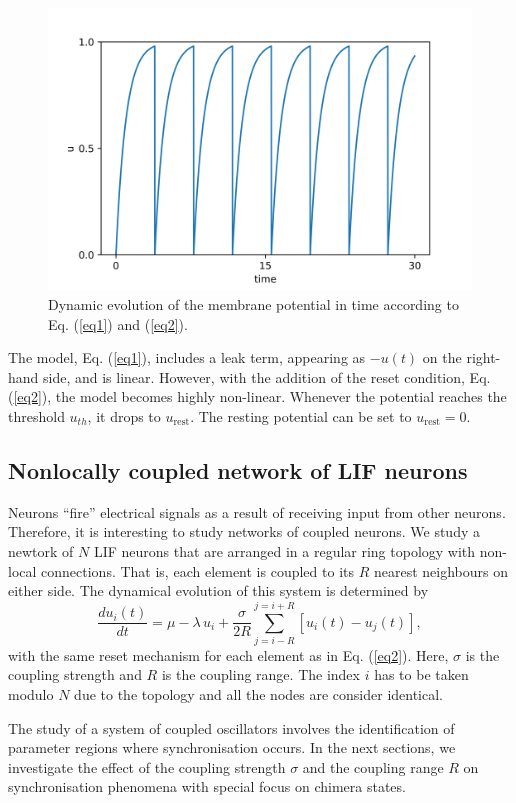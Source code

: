 \documentclass[a4paper,12pt]{article}
\begin{document}
\begin{figure}[H]
\centering
\includegraphics[width=0.8 \textwidth]{lif_single.png}
\caption{Dynamic evolution of the membrane potential in time according to Eq. (\ref{eq1}) and (\ref{eq2}).}
\end{figure}

\par The model, Eq. (\ref{eq1}), includes a leak term, appearing as $-u(t)$ on the right-hand side, and is linear. However, with the addition of the reset condition, Eq. (\ref{eq2}), the model becomes highly non-linear. Whenever the potential reaches the threshold $u_{th}$, it drops to $u_{\text{rest}}$. The resting potential can be set to $u_{\text{rest}}=0$. 

\subsection{Nonlocally coupled network of LIF neurons}
Neurons ``fire'' electrical signals as a result of receiving input from other neurons. Therefore, it is interesting to study networks of coupled neurons. We study a newtork of $N$ LIF neurons that are arranged in a regular ring topology with non-local connections. That is, each element is coupled to its $R$ nearest neighbours on either side. The dynamical evolution of this system is determined by
\begin{equation} \label{eqncon}
\frac{d u_i(t)}{dt} = \mu - \lambda \, u_i + \frac{\sigma}{2 R} \sum_{j=i-R}^{j=i+R} [u_i(t) - u_j(t)],
\end{equation}
with the same reset mechanism for each element as in Eq. (\ref{eq2}). Here, $\sigma$ is the coupling strength and $R$ is the coupling range. The index $i$ has to be taken modulo $N$ due to the topology and all the nodes are consider identical. 
\par The study of a system of coupled oscillators involves the identification of parameter regions where synchronisation occurs. In the next sections, we investigate the effect of the coupling strength $\sigma$ and the coupling range $R$ on synchronisation phenomena with special focus on chimera states. 
\end{document}
